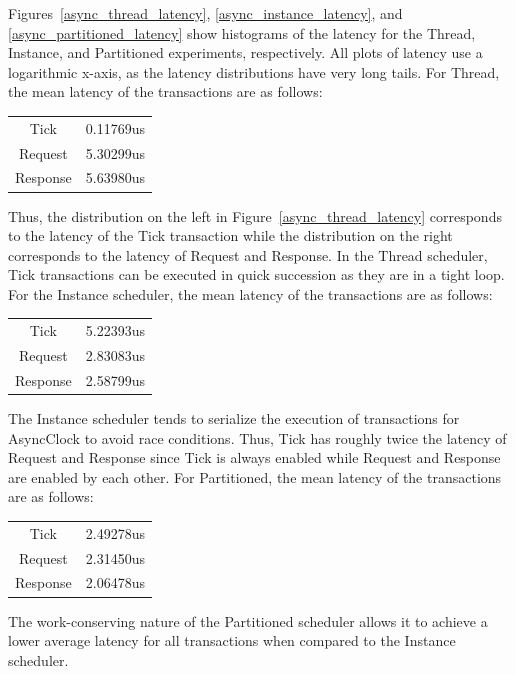 Figures~\ref{async_thread_latency}, \ref{async_instance_latency}, and \ref{async_partitioned_latency} show histograms of the latency for the Thread, Instance, and Partitioned experiments, respectively.
All plots of latency use a logarithmic x-axis, as the latency distributions have very long tails.
For Thread, the mean latency of the transactions are as follows:
\begin{center}
\begin{tabular}{cr}
Tick     & 0.11769us \\
Request  & 5.30299us \\
Response & 5.63980us \\
\end{tabular}
\end{center}
Thus, the distribution on the left in Figure~\ref{async_thread_latency} corresponds to the latency of the Tick transaction while the distribution on the right corresponds to the latency of Request and Response.
In the Thread scheduler, Tick transactions can be executed in quick succession as they are in a tight loop.
For the Instance scheduler, the mean latency of the transactions are as follows:
\begin{center}
\begin{tabular}{cr}
Tick     & 5.22393us \\
Request  & 2.83083us \\
Response & 2.58799us \\
\end{tabular}
\end{center}
The Instance scheduler tends to serialize the execution of transactions for AsyncClock to avoid race conditions.
Thus, Tick has roughly twice the latency of Request and Response since Tick is always enabled while Request and Response are enabled by each other.
For Partitioned, the mean latency of the transactions are as follows:
\begin{center}
\begin{tabular}{cr}
Tick     & 2.49278us \\
Request  & 2.31450us \\
Response & 2.06478us \\
\end{tabular}
\end{center}
The work-conserving nature of the Partitioned scheduler allows it to achieve a lower average latency for all transactions when compared to the Instance scheduler.

